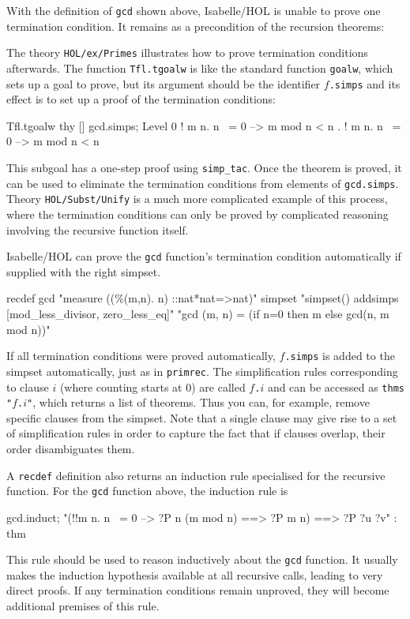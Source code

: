 With the definition of \texttt{gcd} shown above, Isabelle/HOL is unable to
prove one termination condition.  It remains as a precondition of the
recursion theorems:
The theory \texttt{HOL/ex/Primes} illustrates how to prove termination
conditions afterwards.  The function \texttt{Tfl.tgoalw} is like the standard
function \texttt{goalw}, which sets up a goal to prove, but its argument
should be the identifier $f$\texttt{.simps} and its effect is to set up a
proof of the termination conditions:
\begin{ttbox}
Tfl.tgoalw thy [] gcd.simps;
{\out Level 0}
{\out ! m n. n ~= 0 --> m mod n < n}
{. ! m n. n ~= 0 --> m mod n < n}
\end{ttbox}
This subgoal has a one-step proof using \texttt{simp_tac}.  Once the theorem
is proved, it can be used to eliminate the termination conditions from
elements of \texttt{gcd.simps}.  Theory \texttt{HOL/Subst/Unify} is a much
more complicated example of this process, where the termination conditions can
only be proved by complicated reasoning involving the recursive function
itself.

Isabelle/HOL can prove the \texttt{gcd} function's termination condition
automatically if supplied with the right simpset.
\begin{ttbox}
recdef gcd "measure ((\%(m,n). n) ::nat*nat=>nat)"
  simpset "simpset() addsimps [mod_less_divisor, zero_less_eq]"
    "gcd (m, n) = (if n=0 then m else gcd(n, m mod n))"
\end{ttbox}

If all termination conditions were proved automatically, $f$\texttt{.simps}
is added to the simpset automatically, just as in \texttt{primrec}. 
The simplification rules corresponding to clause $i$ (where counting starts
at 0) are called $f$\texttt{.}$i$ and can be accessed as \texttt{thms
  "$f$.$i$"},
which returns a list of theorems. Thus you can, for example, remove specific
clauses from the simpset. Note that a single clause may give rise to a set of
simplification rules in order to capture the fact that if clauses overlap,
their order disambiguates them.

A \texttt{recdef} definition also returns an induction rule specialised for
the recursive function.  For the \texttt{gcd} function above, the induction
rule is
\begin{ttbox}
gcd.induct;
{\out "(!!m n. n ~= 0 --> ?P n (m mod n) ==> ?P m n) ==> ?P ?u ?v" : thm}
\end{ttbox}
This rule should be used to reason inductively about the \texttt{gcd}
function.  It usually makes the induction hypothesis available at all
recursive calls, leading to very direct proofs.  If any termination conditions
remain unproved, they will become additional premises of this rule.

